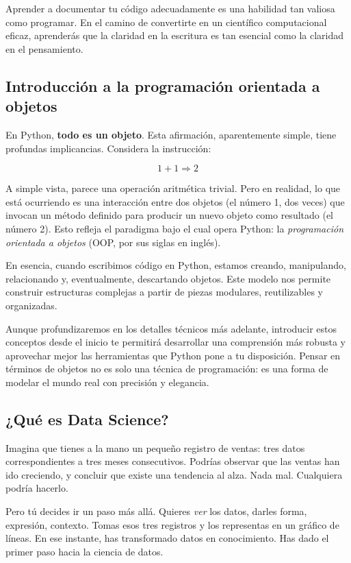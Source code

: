 \documentclass{article}
\theoremstyle{nonumberplain}
\begin{document}
Aprender a documentar tu código adecuadamente es una habilidad tan valiosa como programar. En el camino de convertirte en un científico computacional eficaz, aprenderás que la claridad en la escritura es tan esencial como la claridad en el pensamiento.

\subsection*{Introducción a la programación orientada a objetos}

En Python, \textbf{todo es un objeto}. Esta afirmación, aparentemente simple, tiene profundas implicancias. Considera la instrucción:

\[
1 + 1 \Rightarrow 2
\]

A simple vista, parece una operación aritmética trivial. Pero en realidad, lo que está ocurriendo es una interacción entre dos objetos (el número 1, dos veces) que invocan un método definido para producir un nuevo objeto como resultado (el número 2). Esto refleja el paradigma bajo el cual opera Python: la \textit{programación orientada a objetos} (OOP, por sus siglas en inglés).

En esencia, cuando escribimos código en Python, estamos creando, manipulando, relacionando y, eventualmente, descartando objetos. Este modelo nos permite construir estructuras complejas a partir de piezas modulares, reutilizables y organizadas.

Aunque profundizaremos en los detalles técnicos más adelante, introducir estos conceptos desde el inicio te permitirá desarrollar una comprensión más robusta y aprovechar mejor las herramientas que Python pone a tu disposición. Pensar en términos de objetos no es solo una técnica de programación: es una forma de modelar el mundo real con precisión y elegancia.

\subsection*{¿Qué es Data Science?}

Imagina que tienes a la mano un pequeño registro de ventas: tres datos correspondientes a tres meses consecutivos. Podrías observar que las ventas han ido creciendo, y concluir que existe una tendencia al alza. Nada mal. Cualquiera podría hacerlo.

Pero tú decides ir un paso más allá. Quieres \textit{ver} los datos, darles forma, expresión, contexto. Tomas esos tres registros y los representas en un gráfico de líneas. En ese instante, has transformado datos en conocimiento. Has dado el primer paso hacia la ciencia de datos.
\end{document}
